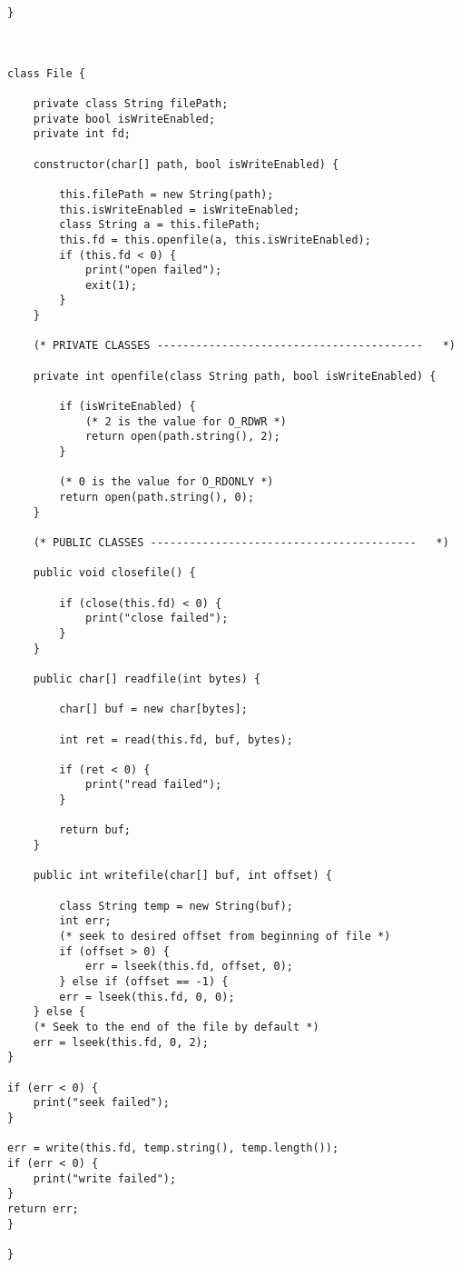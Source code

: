 \begin{verbatim}
}



class File {
	
	private class String filePath;
	private bool isWriteEnabled;
	private int fd;
	
	constructor(char[] path, bool isWriteEnabled) {
		
		this.filePath = new String(path);
		this.isWriteEnabled = isWriteEnabled;
		class String a = this.filePath;
		this.fd = this.openfile(a, this.isWriteEnabled);
		if (this.fd < 0) {
			print("open failed");
			exit(1);
		}
	}
	
	(* PRIVATE CLASSES -----------------------------------------   *)
	
	private int openfile(class String path, bool isWriteEnabled) {
		
		if (isWriteEnabled) {
			(* 2 is the value for O_RDWR *)
			return open(path.string(), 2);
		} 
		
		(* 0 is the value for O_RDONLY *)
		return open(path.string(), 0);
	}
	
	(* PUBLIC CLASSES -----------------------------------------   *)
	
	public void closefile() {
		
		if (close(this.fd) < 0) {
			print("close failed");
		}
	}
	
	public char[] readfile(int bytes) {
		
		char[] buf = new char[bytes];
		
		int ret = read(this.fd, buf, bytes);
		
		if (ret < 0) {
			print("read failed");
		}
		
		return buf;
	}
	
	public int writefile(char[] buf, int offset) {
		
		class String temp = new String(buf);
		int err;
		(* seek to desired offset from beginning of file *)
		if (offset > 0) {
			err = lseek(this.fd, offset, 0);
		} else if (offset == -1) {
		err = lseek(this.fd, 0, 0);
	} else {
	(* Seek to the end of the file by default *)
	err = lseek(this.fd, 0, 2);
}

if (err < 0) {
	print("seek failed");
}

err = write(this.fd, temp.string(), temp.length());
if (err < 0) {
	print("write failed");
}
return err;
}

}    



\end{verbatim}	